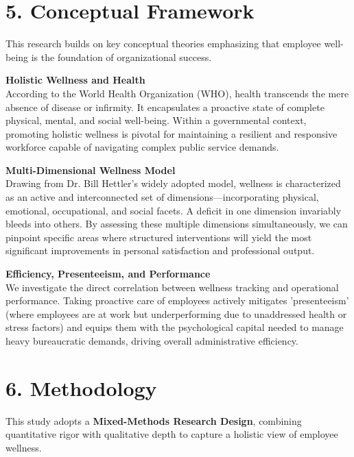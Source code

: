 \documentclass[11pt,a4paper]{article}
\begin{document}
\section{5. Conceptual Framework}
\vspace{0.2cm}
This research builds on key conceptual theories emphasizing that employee well-being is the foundation of organizational success.

\textbf{Holistic Wellness and Health}\\
According to the World Health Organization (WHO), health transcends the mere absence of disease or infirmity. It encapsulates a proactive state of complete physical, mental, and social well-being. Within a governmental context, promoting holistic wellness is pivotal for maintaining a resilient and responsive workforce capable of navigating complex public service demands.

\textbf{Multi-Dimensional Wellness Model}\\
Drawing from Dr. Bill Hettler's widely adopted model, wellness is characterized as an active and interconnected set of dimensions—incorporating physical, emotional, occupational, and social facets. A deficit in one dimension invariably bleeds into others. By assessing these multiple dimensions simultaneously, we can pinpoint specific areas where structured interventions will yield the most significant improvements in personal satisfaction and professional output.

\textbf{Efficiency, Presenteeism, and Performance}\\
We investigate the direct correlation between wellness tracking and operational performance. Taking proactive care of employees actively mitigates 'presenteeism' (where employees are at work but underperforming due to unaddressed health or stress factors) and equips them with the psychological capital needed to manage heavy bureaucratic demands, driving overall administrative efficiency.

\section{6. Methodology}
\vspace{0.2cm}
This study adopts a \textbf{Mixed-Methods Research Design}, combining quantitative rigor with qualitative depth to capture a holistic view of employee wellness.
\end{document}
